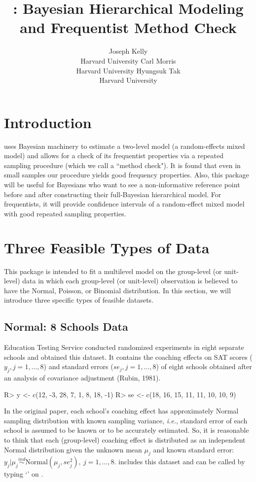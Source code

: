 \documentclass[article]{jss}
\author{Joseph Kelly\\Harvard University \And 
             Carl Morris\\ Harvard University\And
             Hyungsuk Tak\\Harvard University }
\title{\pkg{Rgbp}: Bayesian Hierarchical Modeling and Frequentist Method Check}
\begin{document}

\section[introduction]{Introduction}
 uses Bayesian machinery to estimate a two-level model (a random-effects mixed model) and allows for a check of its frequentist properties via a repeated sampling procedure (which we call a ``method check"). It is found that even in small samples our procedure yields good frequency properties. Also, this package will be useful for Bayesians who want to see a non-informative reference point before and after constructing their full-Bayesian hierarchical model. For frequentists, it will provide confidence intervals of a random-effect mixed model with good repeated sampling properties.

\section[Feasible Data Types]{Three Feasible Types of Data }
This package is intended to fit a multilevel model on the group-level (or unit-level) data in which each group-level (or unit-level) observation is believed to have the Normal, Poisson, or Binomial distribution. In this section, we will introduce three specific types of feasible datasets.

\subsection{Normal: 8 Schools Data}
Education Testing Service conducted randomized experiments in eight separate schools and obtained this dataset. It contains the coaching effects on SAT scores ($y_{j}, j=1, \ldots, 8$) and standard errors ($se_{j}, j=1, \ldots, 8$) of eight schools obtained after an analysis of covariance adjustment (Rubin, 1981).
\begin{CodeChunk}
\begin{CodeInput}
R> y  <- c(12, -3, 28,  7,  1,  8, 18, -1)
R> se <- c(18, 16, 15, 11, 11, 10, 10,  9)
\end{CodeInput}
\end{CodeChunk}

In the original paper, each school's coaching effect has approximately Normal sampling distribution with known sampling variance, \emph{i.e.}, standard error of each school is assumed to be known or to be accurately estimated. So, it is reasonable to think that each (group-level) coaching effect is distributed as an independent Normal distribution given the unknown mean $\mu_{j}$ and known standard error:  $y_{j}\vert\mu_{j}\stackrel{ind}{\sim} \textrm{Normal}(\mu_{j}, se^{2}_{j}),~ j=1, \ldots, 8$.  includes this dataset and can be called by typing `' on .
\end{document}
